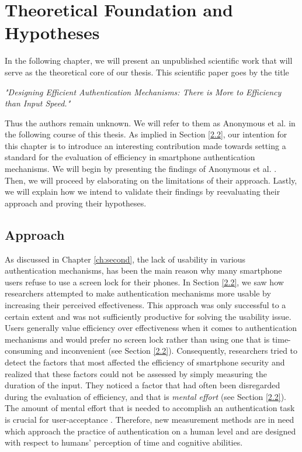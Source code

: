 
\chapter{Theoretical Foundation and Hypotheses}\label{ch:third}

In the following chapter, we will present an unpublished scientific work that will serve as the theoretical core of our thesis. This scientific paper goes by the title 
\begin{center}
 \textit{"Designing Efficient Authentication Mechanisms: There is More to Efficiency than Input Speed."}   
\end{center}
Thus the authors remain unknown. We will refer to them as Anonymous et al. \cite{anonymous} in the following course of this thesis. As implied in Section \ref{2.2}, our intention for this chapter is to introduce an interesting contribution made towards setting a standard for the evaluation of efficiency in smartphone authentication mechanisms. We will begin by presenting the findings of Anonymous et al. \cite{anonymous}. Then, we will proceed by elaborating on the limitations of their approach. Lastly, we will explain how we intend to validate their findings by reevaluating their approach and proving their hypotheses.

\section{Approach}

As discussed in Chapter \ref{ch:second}, the lack of usability in various authentication mechanisms, has been the main reason why many smartphone users refuse to use a screen lock for their phones. In Section \ref{2.2}, we saw how researchers attempted to make authentication mechanisms more usable by increasing their perceived effectiveness. This approach was only successful to a certain extent and was not sufficiently productive for solving the usability issue. Users generally value efficiency over effectiveness when it comes to authentication mechanisms and would prefer no screen lock rather than using one that is time-consuming and inconvenient (see Section \ref{2.2}). Consequently, researchers tried to detect the factors that most affected the efficiency of smartphone security and realized that these factors could not be assessed by simply measuring the duration of the input. They noticed a factor that had often been disregarded during the evaluation of efficiency, and that is \textit{mental effort} (see Section \ref{2.2}). The amount of mental effort that is needed to accomplish an authentication task is crucial for user-acceptance \cite{anonymous}. Therefore, new measurement methods are in need which approach the practice of authentication on a human level and are designed with respect to humans' perception of time and cognitive abilities. \\


